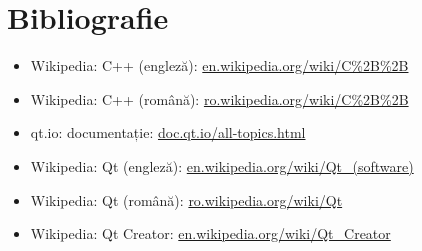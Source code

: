 \section{Bibliografie}
\begin{itemize}
 \item Wikipedia: C++ (engleză): \url{en.wikipedia.org/wiki/C\%2B\%2B}
 \item Wikipedia: C++ (română): \url{ro.wikipedia.org/wiki/C\%2B\%2B}
 \item qt.io: documentație: \url{doc.qt.io/all-topics.html}
 \item Wikipedia: Qt (engleză): \url{en.wikipedia.org/wiki/Qt_(software)}
 \item Wikipedia: Qt (română): \url{ro.wikipedia.org/wiki/Qt}
 \item Wikipedia: Qt Creator: \url{en.wikipedia.org/wiki/Qt_Creator}
\end{itemize}
